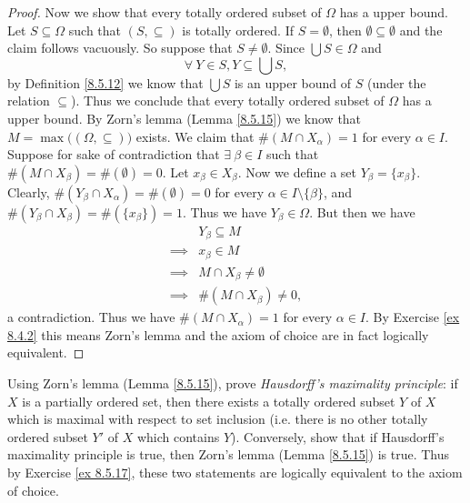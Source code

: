\begin{proof}
    Now we show that every totally ordered subset of \(\Omega\) has a upper bound.
    Let \(S \subseteq \Omega\) such that \((S, \subseteq)\) is totally ordered.
    If \(S = \emptyset\), then \(\emptyset \subseteq \emptyset\) and the claim follows vacuously.
    So suppose that \(S \neq \emptyset\).
    Since \(\bigcup S \in \Omega\) and
    \[
        \forall\ Y \in S, Y \subseteq \bigcup S,
    \]
    by Definition \ref{8.5.12} we know that \(\bigcup S\) is an upper bound of \(S\) (under the relation \(\subseteq\)).
    Thus we conclude that every totally ordered subset of \(\Omega\) has a upper bound.
    By Zorn's lemma (Lemma \ref{8.5.15}) we know that \(M = \max\big((\Omega, \subseteq)\big)\) exists.
    We claim that \(\#(M \cap X_{\alpha}) = 1\) for every \(\alpha \in I\).
    Suppose for sake of contradiction that \(\exists\ \beta \in I\) such that \(\#(M \cap X_{\beta}) = \#(\emptyset) = 0\).
    Let \(x_{\beta} \in X_{\beta}\).
    Now we define a set \(Y_{\beta} = \{x_{\beta}\}\).
    Clearly, \(\#(Y_{\beta} \cap X_{\alpha}) = \#(\emptyset) = 0\) for every \(\alpha \in I \setminus \{\beta\}\), and \(\#(Y_{\beta} \cap X_{\beta}) = \#(\{x_{\beta}\}) = 1\).
    Thus we have \(Y_{\beta} \in \Omega\).
    But then we have
    \begin{align*}
                 & Y_{\beta} \subseteq M           \\
        \implies & x_{\beta} \in M                 \\
        \implies & M \cap X_{\beta} \neq \emptyset \\
        \implies & \#(M \cap X_{\beta}) \neq 0,
    \end{align*}
    a contradiction.
    Thus we have \(\#(M \cap X_{\alpha}) = 1\) for every \(\alpha \in I\).
    By Exercise \ref{ex 8.4.2} this means Zorn's lemma and the axiom of choice are in fact logically equivalent.
\end{proof}

\begin{exercise}\label{ex 8.5.18}
    Using Zorn's lemma (Lemma \ref{8.5.15}), prove \emph{Hausdorff's maximality principle}:
    if \(X\) is a partially ordered set, then there exists a totally ordered subset \(Y\) of \(X\) which is maximal with respect to set inclusion
    (i.e. there is no other totally ordered subset \(Y'\) of \(X\) which contains \(Y\)).
    Conversely, show that if Hausdorff's maximality principle is true, then Zorn's lemma (Lemma \ref{8.5.15}) is true.
    Thus by Exercise \ref{ex 8.5.17}, these two statements are logically equivalent to the axiom of choice.
\end{exercise}

